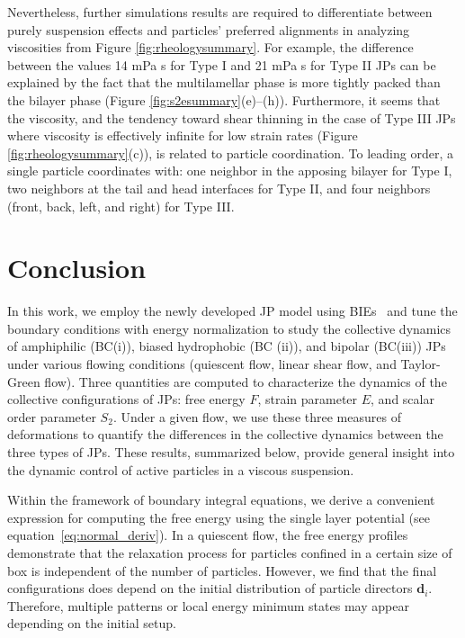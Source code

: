 \documentclass[prb,preprint,showpacs,preprintnumbers,amsmath,amssymb,longbibliography]{revtex4-1}
\newcommand{\dd}{\mathbf{d}}
\begin{document}
Nevertheless, further simulations results are required to 
differentiate between purely suspension effects
and particles' preferred alignments
in analyzing viscosities from Figure \ref{fig:rheologysummary}. 
For example, the difference between the values 14 mPa s for Type I and 
21 mPa s for Type II JPs can be explained by the fact that 
the multilamellar phase is more tightly packed than the bilayer phase
(Figure \ref{fig:s2esummary}(e)--(h)).
Furthermore, it seems that the viscosity, and the tendency toward
shear thinning in the case of Type III JPs where viscosity is 
effectively infinite for low strain rates 
(Figure \ref{fig:rheologysummary}(c)), is related 
to particle coordination.  
To leading order, a single particle coordinates with: 
one neighbor in the apposing bilayer for Type I, two neighbors
at the tail and head interfaces for Type II, and four
neighbors (front, back, left, and right) for Type III.



\section{Conclusion}
\label{sec:conclusion}

In this work, we employ the newly developed JP model using
BIEs~\cite{Fu20, Fu2022_JFM} and tune the boundary conditions with
energy normalization to study the collective dynamics of amphiphilic
(BC(i)), biased hydrophobic (BC (ii)), and bipolar (BC(iii)) JPs under
various flowing conditions (quiescent flow, linear shear flow, and
Taylor-Green flow). Three quantities are computed to characterize the
dynamics of the collective configurations of JPs: free energy $F$,
strain parameter $E$, and scalar order parameter $S_2$. 
Under a given flow, we use these three measures of deformations to
quantify the differences in the collective dynamics between the three
types of JPs. These results, summarized below, provide general insight
into the dynamic control of active particles in a viscous suspension.

Within the framework of boundary integral equations, we derive a
convenient expression for computing the free energy using the single
layer potential (see equation~\eqref{eq:normal_deriv}). In a quiescent
flow, the free energy profiles demonstrate that the relaxation process
for particles confined in a certain size of box is independent of the
number of particles. However, we find that the final configurations does
depend on the initial distribution of particle directors $\dd_i$.
Therefore, multiple patterns or local energy minimum states may appear
depending on the initial setup.
\end{document}
